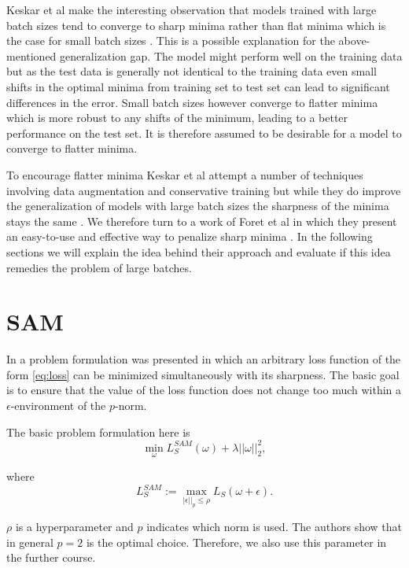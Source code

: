 \documentclass[10pt,conference,compsocconf]{IEEEtran}
\begin{document}
Keskar et al make the interesting observation that models trained with large batch sizes tend to converge to sharp minima rather than flat minima which is the case for small batch sizes \cite{keskar2017largebatch}. This is a possible explanation for the above-mentioned generalization gap. The model might perform well on the training data but as the test data is generally not identical to the training data even small shifts in the optimal minima from training set to test set can lead to significant differences in the error. Small batch sizes however converge to flatter minima which is more robust to any shifts of the minimum, leading to a better performance on the test set. It is therefore assumed to be desirable for a model to converge to flatter minima.

To encourage flatter minima Keskar et al attempt a number of techniques involving data augmentation and conservative training but while they do improve the generalization of models with large batch sizes the sharpness of the minima stays the same \cite{keskar2017largebatch}. We therefore turn to a work of Foret et al in which they present an easy-to-use and effective way to penalize sharp minima \cite{foret2021sharpnessaware}. In the following sections we will explain the idea behind their approach and evaluate if this idea remedies the problem of large batches.

\section{SAM}
In \cite{foret2021sharpnessaware} a problem formulation was presented in which an arbitrary loss function of the form \eqref{eq:loss} can be minimized simultaneously with its sharpness. The basic goal is to ensure that the value of the loss function does not change too much within a $\epsilon$-environment of the $p$-norm. 

The basic problem formulation here is 
\begin{equation} \label{eq:sam_real}
\min_\omega L_S^{SAM}(\omega) + \lambda ||\omega||_2^2,
\end{equation}

where 
\begin{equation} \label{eq:sam_eps}
L_S^{SAM} := \max_{|\epsilon||_p \leq \rho} L_S(\omega + \epsilon).
\end{equation}

$\rho$ is a hyperparameter and $p$ indicates which norm is used. The authors show that in general $p = 2$ is the optimal choice. Therefore, we also use this parameter in the further course. 
\end{document}
